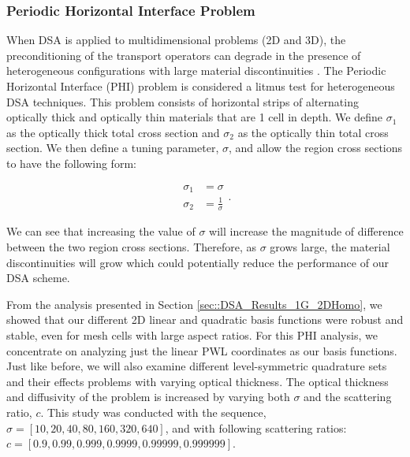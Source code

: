 \subsubsection{Periodic Horizontal Interface Problem}
\label{sec::DSA_Results_1G_PHI}

When DSA is applied to multidimensional problems (2D and 3D), the preconditioning of the transport operators can degrade in the presence of heterogeneous configurations with large material discontinuities \cite{azmy2002unconditionally}. The Periodic Horizontal Interface (PHI) problem is considered a litmus test for heterogeneous DSA techniques. This problem consists of horizontal strips of alternating optically thick and optically thin materials that are 1 cell in depth. We define $\sigma_1$ as the optically thick total cross section and $\sigma_2$ as the optically thin total cross section. We then define a tuning parameter, $\sigma$, and allow the region cross sections to have the following form:

\begin{equation}
\begin{aligned}
\sigma_1 &= \sigma \\
\sigma_2 &= \frac{1}{\sigma}
\end{aligned}.
\end{equation}

\noindent We can see that increasing the value of $\sigma$ will increase the magnitude of difference between the two region cross sections. Therefore, as $\sigma$ grows large, the material discontinuities will grow which could potentially reduce the performance of our DSA scheme.

From the analysis presented in Section \ref{sec::DSA_Results_1G_2DHomo}, we showed that our different 2D linear and quadratic basis functions were robust and stable, even for mesh cells with large aspect ratios. For this PHI analysis, we concentrate on analyzing just the linear PWL coordinates as our basis functions. Just like before, we will also examine different level-symmetric quadrature sets and their effects problems with varying optical thickness. The optical thickness and diffusivity of the problem is increased by varying both $\sigma$ and the scattering ratio, $c$. This study was conducted with the sequence, $\sigma = \left[ 10, 20, 40, 80, 160, 320, 640  \right]$, and with following scattering ratios: $c = \left[ 0.9,0.99,0.999,0.9999,0.99999,0.999999  \right]$.

